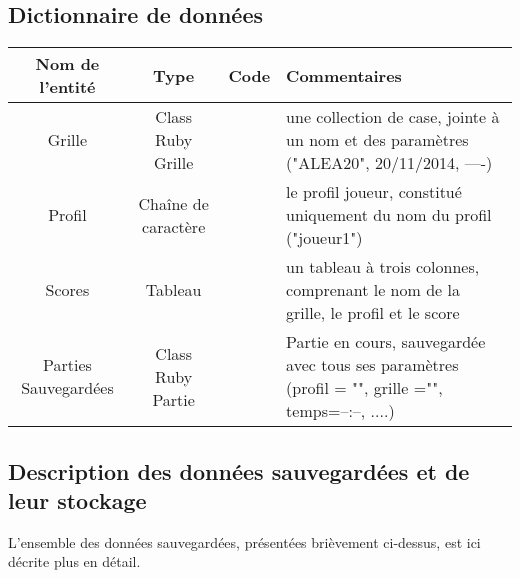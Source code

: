 \documentclass[11pt]{article}
\begin{document}
\subsection{Dictionnaire de données}


\begin{tabular}{|c|c|c|l|}\hline
    {\bf Nom de l'entité} & {\bf Type } & {\bf Code} & {\bf Commentaires}\\\hline
    Grille & Class Ruby Grille & & une collection de case, jointe à un nom et des paramètres ("ALEA20", 20/11/2014, ----)\\\hline
    Profil & Chaîne de caractère & & le profil joueur, constitué uniquement du nom du profil ("joueur1")\\\hline
    Scores & Tableau & & un tableau à trois colonnes, comprenant le nom de la grille, le profil et le score\\\hline
    Parties Sauvegardées & Class Ruby Partie & & Partie en cours, sauvegardée avec tous ses paramètres (profil = "", grille ="", temps=--:--, ....) \\\hline 
\end{tabular}

\subsection{Description des données sauvegardées et de leur stockage}
L'ensemble des données sauvegardées, présentées brièvement ci-dessus, est ici décrite plus en détail.
\end{document}
